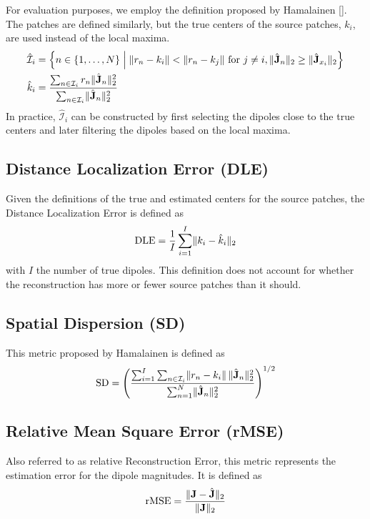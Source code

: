 For evaluation purposes, we employ the definition proposed by Hamalainen []. 
%
The patches are defined similarly, but the true centers of the source patches, $k_i$, are used instead of the local maxima.
\begin{align}
\hat{\mathcal{I}}_i
&=
\left\{  n\in \left\{ 1, \dots, N \right\} \;\middle|\; 
\lVert r_n - k_i \rVert < \lVert r_n - k_j \rVert \text{ for } j\neq i,
\lVert \hat{\mathbf{J}}_n \rVert_2\geq \lVert \hat{\mathbf{J}}_{x_i} \rVert_2  \right\}
\\
\hat{k}_i &= 
\frac{\sum_{n\in \mathcal{I}_i} r_n \lVert \hat{\mathbf{J}}_n \rVert_2^2 }{\sum_{n\in \mathcal{I}_i} \lVert \hat{\mathbf{J}}_n \rVert_2^2}
\end{align}
In practice, $\hat{\mathcal{I}}_i$ can be constructed by first selecting the dipoles close to the true centers and later filtering the dipoles based on the local maxima.

\subsection{Distance Localization Error (DLE)}

Given the definitions of the true and estimated centers for the source patches, the Distance Localization Error is defined as
\begin{equation}
\text{DLE} = 
\frac{1}{I} \sum_{i=1}^I \lVert  k_i - \hat{k}_i  \rVert_2
\label{def:DLE}
\end{equation}
with $I$ the number of true dipoles.
%
This definition does not account for whether the reconstruction has more or fewer source patches than it should.

\subsection{Spatial Dispersion (SD)}

This metric proposed by Hamalainen is defined as
\begin{equation}
\text{SD}
=
\left( 
\frac{ \sum_{i=1}^I \sum_{n\in \mathcal{I}_i} \lVert r_n-k_i \rVert\,  \lVert \hat{\mathbf{J}}_n \rVert_2^2 }{\sum_{n=1}^N \lVert \hat{\mathbf{J}}_n \rVert_2^2}
 \right)^{1/2}
\end{equation}

\subsection{Relative Mean Square Error (rMSE)}

Also referred to as relative Reconstruction Error, this metric represents the estimation error for the dipole magnitudes. 
%
It is defined as
\begin{equation}
\text{rMSE} = 
\frac{\lVert \mathbf{J} - \hat{\mathbf{J}} \rVert_2}{\lVert \mathbf{J} \rVert_2}
\end{equation}

